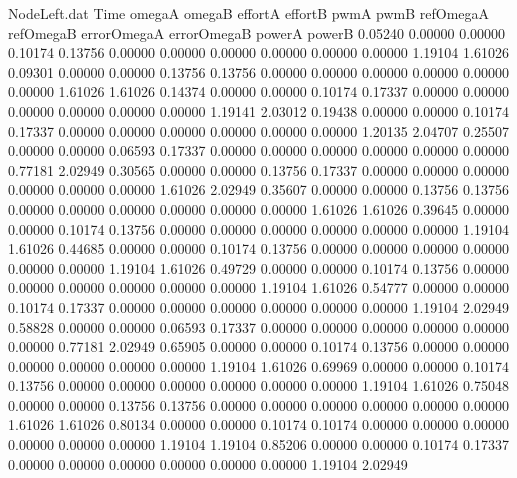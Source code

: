\begin{filecontents}{NodeLeft.dat}
Time omegaA omegaB effortA effortB pwmA pwmB refOmegaA refOmegaB errorOmegaA errorOmegaB powerA powerB
   0.05240    0.00000    0.00000     0.10174    0.13756    0.00000    0.00000    0.00000    0.00000    0.00000    0.00000    1.19104    1.61026
   0.09301    0.00000    0.00000     0.13756    0.13756    0.00000    0.00000    0.00000    0.00000    0.00000    0.00000    1.61026    1.61026
   0.14374    0.00000    0.00000     0.10174    0.17337    0.00000    0.00000    0.00000    0.00000    0.00000    0.00000    1.19141    2.03012
   0.19438    0.00000    0.00000     0.10174    0.17337    0.00000    0.00000    0.00000    0.00000    0.00000    0.00000    1.20135    2.04707
   0.25507    0.00000    0.00000     0.06593    0.17337    0.00000    0.00000    0.00000    0.00000    0.00000    0.00000    0.77181    2.02949
   0.30565    0.00000    0.00000     0.13756    0.17337    0.00000    0.00000    0.00000    0.00000    0.00000    0.00000    1.61026    2.02949
   0.35607    0.00000    0.00000     0.13756    0.13756    0.00000    0.00000    0.00000    0.00000    0.00000    0.00000    1.61026    1.61026
   0.39645    0.00000    0.00000     0.10174    0.13756    0.00000    0.00000    0.00000    0.00000    0.00000    0.00000    1.19104    1.61026
   0.44685    0.00000    0.00000     0.10174    0.13756    0.00000    0.00000    0.00000    0.00000    0.00000    0.00000    1.19104    1.61026
   0.49729    0.00000    0.00000     0.10174    0.13756    0.00000    0.00000    0.00000    0.00000    0.00000    0.00000    1.19104    1.61026
   0.54777    0.00000    0.00000     0.10174    0.17337    0.00000    0.00000    0.00000    0.00000    0.00000    0.00000    1.19104    2.02949
   0.58828    0.00000    0.00000     0.06593    0.17337    0.00000    0.00000    0.00000    0.00000    0.00000    0.00000    0.77181    2.02949
   0.65905    0.00000    0.00000     0.10174    0.13756    0.00000    0.00000    0.00000    0.00000    0.00000    0.00000    1.19104    1.61026
   0.69969    0.00000    0.00000     0.10174    0.13756    0.00000    0.00000    0.00000    0.00000    0.00000    0.00000    1.19104    1.61026
   0.75048    0.00000    0.00000     0.13756    0.13756    0.00000    0.00000    0.00000    0.00000    0.00000    0.00000    1.61026    1.61026
   0.80134    0.00000    0.00000     0.10174    0.10174    0.00000    0.00000    0.00000    0.00000    0.00000    0.00000    1.19104    1.19104
   0.85206    0.00000    0.00000     0.10174    0.17337    0.00000    0.00000    0.00000    0.00000    0.00000    0.00000    1.19104    2.02949

\end{filecontents}
